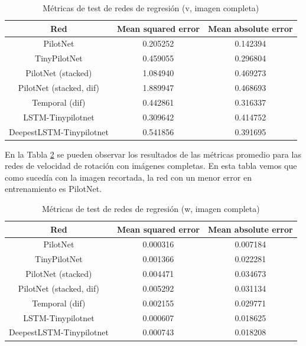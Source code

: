 \begin{table}[H]
\centering
\caption{Métricas de test de redes de regresión (v, imagen completa)}
\label{metricas_regresion_completa_v}
\begin{tabular}{c|c|c|}
\cline{1-3}
                        \multicolumn{1}{|c|}{Red}    & Mean squared error       & Mean absolute error             \\ \hline
\multicolumn{1}{|c|}{PilotNet}    & 0.205252    & 0.142394    \\ \hline
\multicolumn{1}{|c|}{TinyPilotNet}     & 0.459055      & 0.296804   \\ \hline
\multicolumn{1}{|c|}{PilotNet (stacked)}   & 1.084940    & 0.469273  \\ \hline
\multicolumn{1}{|c|}{PilotNet (stacked, dif)}     & 1.889947    & 0.468693        \\ \hline
\multicolumn{1}{|c|}{Temporal (dif)}      & 0.442861     & 0.316337   \\ \hline
\multicolumn{1}{|c|}{LSTM-Tinypilotnet}     & 0.309642    & 0.414752        \\ \hline
\multicolumn{1}{|c|}{DeepestLSTM-Tinypilotnet}     & 0.541856   & 0.391695    \\ \hline
\end{tabular}
\end{table}

En la Tabla \ref{metricas_regresion_completa_w} se pueden observar los resultados de las métricas promedio para las redes de velocidad de rotación con imágenes completas. En esta tabla vemos que como sucedía con la imagen recortada, la red con un menor error en entrenamiento es PilotNet.\\

\begin{table}[H]
\centering
\caption{Métricas de test de redes de regresión (w, imagen completa)}
\label{metricas_regresion_completa_w}
\begin{tabular}{c|c|c|}
\cline{1-3}
                        \multicolumn{1}{|c|}{Red}    & Mean squared error       & Mean absolute error             \\ \hline
\multicolumn{1}{|c|}{PilotNet}    & 0.000316   & 0.007184    \\ \hline
\multicolumn{1}{|c|}{TinyPilotNet}     & 0.001366      & 0.022281   \\ \hline
\multicolumn{1}{|c|}{PilotNet (stacked)}   & 0.004471    & 0.034673   \\ \hline
\multicolumn{1}{|c|}{PilotNet (stacked, dif)}     & 0.005292    & 0.031134        \\ \hline
\multicolumn{1}{|c|}{Temporal (dif)}      & 0.002155     & 0.029771   \\ \hline
\multicolumn{1}{|c|}{LSTM-Tinypilotnet}     & 0.000607    & 0.018625        \\ \hline
\multicolumn{1}{|c|}{DeepestLSTM-Tinypilotnet}     & 0.000743  & 0.018208        \\ \hline
\end{tabular}
\end{table}


